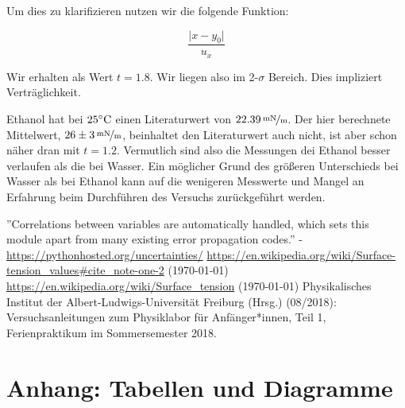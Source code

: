 \documentclass[11pt,a4paper]{article}
\begin{document}
Um dies zu klarifizieren nutzen wir die folgende Funktion:

\begin{equation}
\frac{\vert x-y_0\vert}{u_x}
\end{equation}

Wir erhalten als Wert $t=1.8$. Wir liegen also im 2-$\sigma$ Bereich. Dies impliziert Vertr\"aglichkeit.

Ethanol hat bei $25\celsius$ einen Literaturwert von $22.39\,\nicefrac{\mathrm{mN}}{\mathrm{m}}$. \cite{Ethenol} Der hier berechnete Mittelwert, $26\pm 3\,\nicefrac{\mathrm{mN}}{\mathrm{m}}$, beinhaltet den Literaturwert auch nicht, ist aber schon n\"aher dran mit $t=1.2$. Vermutlich sind also die Messungen dei Ethanol besser verlaufen als die bei Wasser. Ein m\"oglicher Grund des gr\"o\ss eren Unterschieds bei Wasser als bei Ethanol kann auf die wenigeren Messwerte und Mangel an Erfahrung beim Durchf\"uhren des Versuchs zur\"uckgef\"uhrt werden.

\vfill

\begin{thebibliography}{9}
''Correlations between variables are automatically handled, which sets this module apart from many existing error propagation codes.'' - \url{https://pythonhosted.org/uncertainties/}
 \url{https://en.wikipedia.org/wiki/Surface-tension_values#cite_note-one-2} (\today)
 \url{https://en.wikipedia.org/wiki/Surface_tension} (\today)
 Physikalisches Institut der Albert-Ludwigs-Universität Freiburg (Hrsg.) (08/2018): Versuchsanleitungen zum Physiklabor für Anfänger*innen, Teil 1, Ferienpraktikum im Sommersemester 2018.
\end{thebibliography}

\pagebreak

\section{Anhang: Tabellen und Diagramme}
\end{document}
